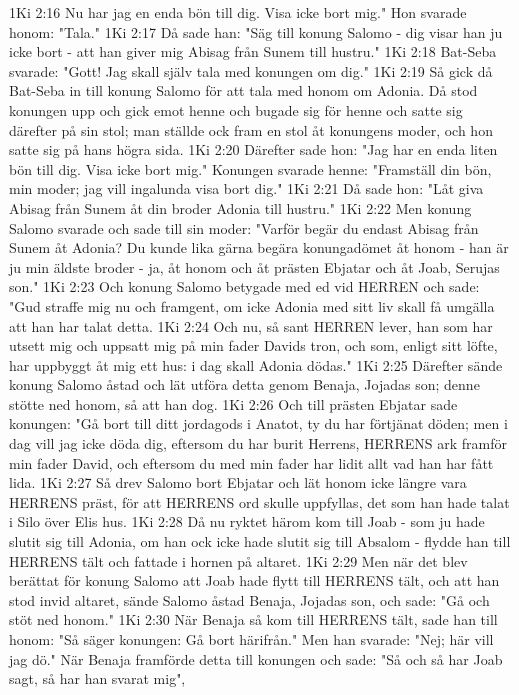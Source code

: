1Ki 2:16  Nu har jag en enda bön till dig. Visa icke bort mig." Hon svarade honom: "Tala."
1Ki 2:17  Då sade han: "Säg till konung Salomo - dig visar han ju icke bort - att han giver mig Abisag från Sunem till hustru."
1Ki 2:18  Bat-Seba svarade: "Gott! Jag skall själv tala med konungen om dig."
1Ki 2:19  Så gick då Bat-Seba in till konung Salomo för att tala med honom om Adonia. Då stod konungen upp och gick emot henne och bugade sig för henne och satte sig därefter på sin stol; man ställde ock fram en stol åt konungens moder, och hon satte sig på hans högra sida.
1Ki 2:20  Därefter sade hon: "Jag har en enda liten bön till dig. Visa icke bort mig." Konungen svarade henne: "Framställ din bön, min moder; jag vill ingalunda visa bort dig."
1Ki 2:21  Då sade hon: "Låt giva Abisag från Sunem åt din broder Adonia till hustru."
1Ki 2:22  Men konung Salomo svarade och sade till sin moder: "Varför begär du endast Abisag från Sunem åt Adonia? Du kunde lika gärna begära konungadömet åt honom - han är ju min äldste broder - ja, åt honom och åt prästen Ebjatar och åt Joab, Serujas son."
1Ki 2:23  Och konung Salomo betygade med ed vid HERREN och sade: "Gud straffe mig nu och framgent, om icke Adonia med sitt liv skall få umgälla att han har talat detta.
1Ki 2:24  Och nu, så sant HERREN lever, han som har utsett mig och uppsatt mig på min fader Davids tron, och som, enligt sitt löfte, har uppbyggt åt mig ett hus: i dag skall Adonia dödas."
1Ki 2:25  Därefter sände konung Salomo åstad och lät utföra detta genom Benaja, Jojadas son; denne stötte ned honom, så att han dog.
1Ki 2:26  Och till prästen Ebjatar sade konungen: "Gå bort till ditt jordagods i Anatot, ty du har förtjänat döden; men i dag vill jag icke döda dig, eftersom du har burit Herrens, HERRENS ark framför min fader David, och eftersom du med min fader har lidit allt vad han har fått lida.
1Ki 2:27  Så drev Salomo bort Ebjatar och lät honom icke längre vara HERRENS präst, för att HERRENS ord skulle uppfyllas, det som han hade talat i Silo över Elis hus.
1Ki 2:28  Då nu ryktet härom kom till Joab - som ju hade slutit sig till Adonia, om han ock icke hade slutit sig till Absalom - flydde han till HERRENS tält och fattade i hornen på altaret.
1Ki 2:29  Men när det blev berättat för konung Salomo att Joab hade flytt till HERRENS tält, och att han stod invid altaret, sände Salomo åstad Benaja, Jojadas son, och sade: "Gå och stöt ned honom."
1Ki 2:30  När Benaja så kom till HERRENS tält, sade han till honom: "Så säger konungen: Gå bort härifrån." Men han svarade: "Nej; här vill jag dö." När Benaja framförde detta till konungen och sade: "Så och så har Joab sagt, så har han svarat mig",
